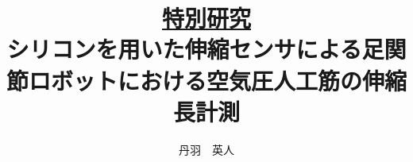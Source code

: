 {\large
\title{\Large{\underline{特別研究}}\\
\vspace{0.5cm}
シリコンを用いた伸縮センサによる足関節ロボットにおける空気圧人工筋の伸縮長計測}}
\author{丹羽　英人}
\maketitle